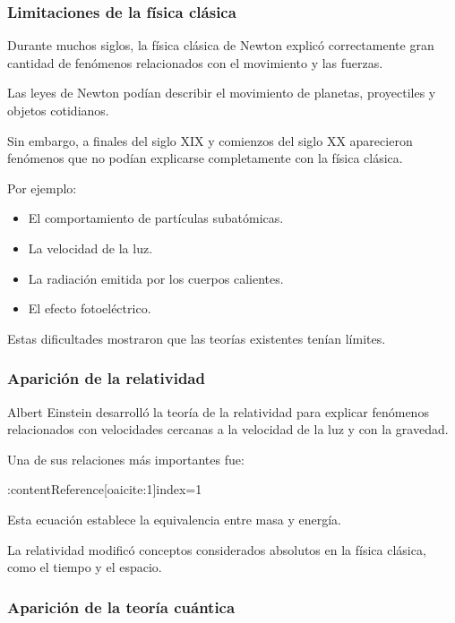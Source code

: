 \documentclass[12pt, a4paper]{article}
\begin{document}
\subsubsection*{Limitaciones de la física clásica}

Durante muchos siglos, la física clásica de Newton explicó correctamente gran cantidad de fenómenos relacionados con el movimiento y las fuerzas.

Las leyes de Newton podían describir el movimiento de planetas, proyectiles y objetos cotidianos.

Sin embargo, a finales del siglo XIX y comienzos del siglo XX aparecieron fenómenos que no podían explicarse completamente con la física clásica.

Por ejemplo:

\begin{itemize}

\item El comportamiento de partículas subatómicas.

\item La velocidad de la luz.

\item La radiación emitida por los cuerpos calientes.

\item El efecto fotoeléctrico.

\end{itemize}

Estas dificultades mostraron que las teorías existentes tenían límites.

\subsubsection*{Aparición de la relatividad}

Albert Einstein desarrolló la teoría de la relatividad para explicar fenómenos relacionados con velocidades cercanas a la velocidad de la luz y con la gravedad.

Una de sus relaciones más importantes fue:

:contentReference[oaicite:1]{index=1}

Esta ecuación establece la equivalencia entre masa y energía.

La relatividad modificó conceptos considerados absolutos en la física clásica, como el tiempo y el espacio.

\subsubsection*{Aparición de la teoría cuántica}
\end{document}
